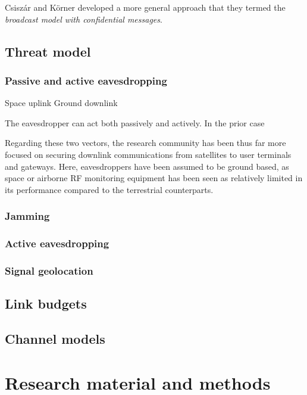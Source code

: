 \documentclass[english, 12pt, a4paper, elec, utf8, a-1b, online]{aaltothesis}
\begin{document}
Csiszár and Körner \cite{csiszar1978broadcast} developed a more general approach that they termed the \textit{broadcast model with confidential messages}. 

\clearpage

\subsection{Threat model}
\subsubsection{Passive and active eavesdropping}
Space uplink
Ground downlink

The eavesdropper can act both passively and actively. In the prior case 

Regarding these two vectors, the research community has been thus far more focused on securing downlink communications from satellites to user terminals and gateways. Here, eavesdroppers have been assumed to be ground based, as space or airborne RF monitoring equipment has been seen as relatively limited in its performance compared to the terrestrial counterparts.

\subsubsection{Jamming}

\subsubsection{Active eavesdropping}

\subsubsection{Signal geolocation}

\subsection{Link budgets}
\subsection{Channel models}

\clearpage

\section{Research material and methods}
\end{document}
